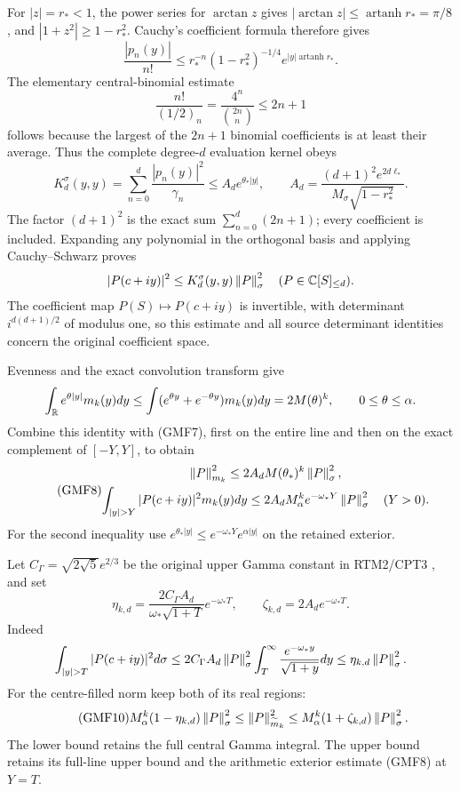 \documentclass[11pt,a4paper]{article}
\begin{document}
For \(|z|=r_*<1\), the power series for \(\arctan z\) gives
\(|\arctan z|\le\operatorname{artanh}r_*=\pi/8\), and
\(|1+z^2|\ge1-r_*^2\).
Cauchy's coefficient formula therefore gives
\[
 \frac{|p_n(y)|}{n!}
 \le r_*^{-n}(1-r_*^2)^{-1/4}
                      e^{|y|\operatorname{artanh}r_*}.
\]
The elementary central-binomial estimate
\[
 \frac{n!}{(1/2)_n}=\frac{4^n}{\binom{2n}{n}}\le2n+1
\]
follows because the largest of the \(2n+1\) binomial coefficients
is at least their average.
Thus the complete degree-\(d\) evaluation kernel obeys
\begin{equation}\tag{GMF7}
 K_d^\sigma(y,y)=\sum_{n=0}^d\frac{|p_n(y)|^2}{\gamma_n}
 \le A_de^{\theta_*|y|},\qquad
 A_d=\frac{(d+1)^2 e^{2d\ell_*}}
               {M_\sigma\sqrt{1-r_*^2}}.
\end{equation}
The factor \((d+1)^2\) is the exact sum
\(\sum_{n=0}^d(2n+1)\); every coefficient is included.
Expanding any polynomial in the orthogonal basis and applying
Cauchy--Schwarz proves
\[
 |P(c+iy)|^2\le K_d^\sigma(y,y)\left\lVert P\right\rVert_\sigma^2
 \quad(P\in\mathbb C[S]_{\le d}).
\]
The coefficient map \(P(S)\mapsto P(c+iy)\) is invertible,
with determinant \(i^{d(d+1)/2}\) of modulus one, so this
estimate and all source determinant identities concern the
original coefficient space.

Evenness and the exact convolution transform give
\[
 \int_\mathbb R e^{\theta|y|}m_k(y)dy
 \le \int(e^{\theta y}+e^{-\theta y})m_k(y)dy
 =2M(\theta)^k,\qquad 0\le\theta\le\alpha.
\]
Combine this identity with (GMF7), first on the entire line
and then on the exact complement of \([-Y,Y]\), to obtain
\begin{equation}\tag{GMF8}
\begin{gathered}
 \norm P_{m_k}^2
 \le2A_dM(\theta_*)^k\norm P_\sigma^2,\\
 \int_{|y|>Y}|P(c+iy)|^2m_k(y)dy
 \le2A_dM_\alpha^k e^{-\omega_*Y}\norm P_\sigma^2
 \quad(Y>0).
\end{gathered}
\end{equation}
For the second inequality use
\(e^{\theta_*|y|}\le e^{-\omega_*Y}e^{\alpha|y|}\)
on the retained exterior.

Let \(C_\Gamma=\sqrt{2\sqrt5}e^{2/3}\) be the original upper
Gamma constant in RTM2/CPT3 \cite{a02gmf:providers,a02gmf:cpt}, and set
\begin{equation}\tag{GMF9}
 \eta_{k,d}=
 \frac{2C_\Gamma A_d}{\omega_*\sqrt{1+T}}e^{-\omega_*T},
 \qquad
 \zeta_{k,d}=2A_de^{-\omega_*T}.
\end{equation}
Indeed
\[
 \int_{|y|>T}|P(c+iy)|^2d\sigma
 \le2C_\Gamma A_d\norm P_\sigma^2
           \int_T^\infty\frac{e^{-\omega_*y}}{\sqrt{1+y}}dy
 \le\eta_{k,d}\norm P_\sigma^2.
\]
For the centre-filled norm keep both of its real regions:
\begin{equation}\tag{GMF10}
 M_\alpha^k(1-\eta_{k,d})\left\lVert P\right\rVert_\sigma^2
 \le\left\lVert P\right\rVert_{\widetilde m_k}^2
 \le M_\alpha^k(1+\zeta_{k,d})\left\lVert P\right\rVert_\sigma^2.
\end{equation}
The lower bound retains the full central Gamma integral.
The upper bound retains its full-line upper bound and the
arithmetic exterior estimate (GMF8) at \(Y=T\).
\end{document}
